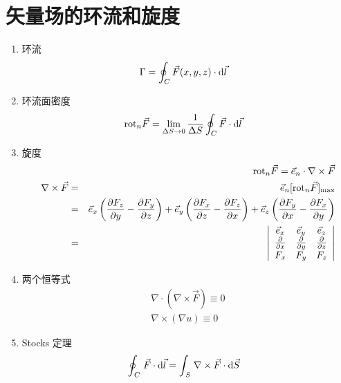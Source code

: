 \section{矢量场的环流和旋度}
\begin{enumerate}
	\item 环流
		\begin{eqnarray}
		&\Gamma  = \oint_C {\vec F(x,y,z) \cdot {\rm{d}}\vec l}	&
		\end{eqnarray}
	\item 环流面密度
		\begin{eqnarray}
		&{\rm{ro}}{{\rm{t}}_n}\vec F = \lim\limits_{\Delta S \to 0} \frac{1}{{\Delta S}}\oint_C {\vec F \cdot {\rm{d}}\vec l}	&
		\end{eqnarray}
	\item 旋度
		\begin{eqnarray*}
		&&{\rm{ro}}{{\rm{t}}_n}\vec F = {\vec e_n} \cdot \nabla  \times \vec F \\
		\nabla  \times \vec F&=&{\vec e_n}{[{\rm{ro}}{{\rm{t}}_n}\vec F]_{\max }} \\
		&=&{{\vec e}_x}\left( {{{\partial {F_z}} \over {\partial y}} - {{\partial {F_y}} \over {\partial z}}} \right) + {{\vec e}_y}\left( {{{\partial {F_x}} \over {\partial z}} - {{\partial {F_z}} \over {\partial x}}} \right) + {{\vec e}_z}\left( {{{\partial {F_y}} \over {\partial x}} - {{\partial {F_x}} \over {\partial y}}} \right) \\
		&=&\left| \begin{array}{ccc}
					{{{\vec e}_x}} & {{{\vec e}_y}} & {{{\vec e}_z}}  \\
					{{\partial  \over {\partial x}}} & {{\partial  \over {\partial y}}} & {{\partial  \over {\partial z}}} \\
					{{F_x}} & {{F_y}} & {{F_z}} 
					\end{array} \right|
		\end{eqnarray*}
	\item  两个恒等式
		\begin{eqnarray}
		&\nabla  \cdot (\nabla  \times \vec F) \equiv 0& \\
		&\nabla  \times (\nabla u) \equiv 0&
		\end{eqnarray}
	\item Stocks 定理
		\begin{eqnarray}
		&\oint_{{\kern 1pt} C} {{\kern 1pt} \vec F \cdot {\rm{d}}\vec l}  = \int_{{\kern 1pt} S} {{\kern 1pt} \nabla  \times \vec F \cdot {\rm{d}}\vec S}&
		\end{eqnarray}
\end{enumerate}

